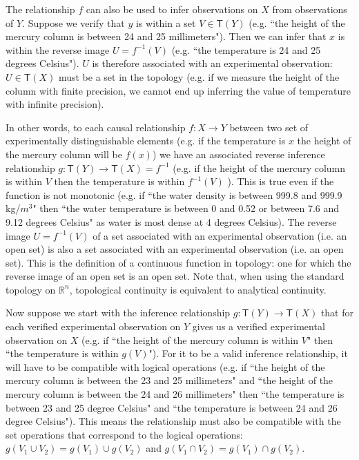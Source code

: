 \documentclass[11pt,letterpaper,fleqn]{memoir} %
\begin{document}
The relationship $f$ can also be used to infer observations on $X$ from observations of $Y$. Suppose we verify that $y$ is within a set $V \in \mathsf{T}(Y)$ (e.g. ``the height of the mercury column is between 24 and 25 millimeters"). Then we can infer that $x$ is within the reverse image $U=f^{-1}(V)$ (e.g. ``the temperature is 24 and 25 degrees Celsius"). $U$ is therefore associated with an experimental observation: $U \in \mathsf{T}(X)$ must be a set in the topology (e.g. if we measure the height of the column with finite precision, we cannot end up inferring the value of temperature with infinite precision).

In other words, to each causal relationship $f: X \rightarrow Y$ between two set of experimentally distinguishable elements (e.g. if the temperature is $x$ the height of the mercury column will be $f(x)$) we have an associated reverse inference relationship $g  : \mathsf{T}(Y) \rightarrow \mathsf{T}(X) = f^{-1}$ (e.g. if the height of the mercury column is within $V$ then the temperature is within $f^{-1}(V)$ ). This is true even if the function is not monotonic (e.g. if ``the water density is between 999.8 and 999.9 kg/$m^3$" then ``the water temperature is between 0 and 0.52 or between 7.6 and 9.12 degrees Celsius" as water is most dense at 4 degrees Celsius).  The reverse image $U=f^{-1}(V)$ of a set associated with an experimental observation (i.e. an open set) is also a set associated with an experimental observation (i.e. an open set). This is the definition of a continuous function in topology: one for which the reverse image of an open set is an open set. Note that, when using the standard topology on $\mathbb{R}^n$, topological continuity is equivalent to analytical continuity.

Now suppose we start with the inference relationship $g  : \mathsf{T}(Y) \rightarrow \mathsf{T}(X)$ that for each verified experimental observation on $Y$ gives us a verified experimental observation on $X$ (e.g. if ``the height of the mercury column is within $V$" then ``the temperature is within $g(V)$"). For it to be a valid inference relationship, it will have to be compatible with logical operations (e.g. if ``the height of the mercury column is between the 23 and 25 millimeters" and ``the height of the mercury column is between the 24 and 26 millimeters" then ``the temperature is between 23 and 25 degree Celsius" and  ``the temperature is between 24 and 26 degree Celsius"). This means the relationship must also be compatible with the set operations that correspond to the logical operations: $g(V_1 \cup V_2)=g(V_1)\cup g(V_2)$ and $g(V_1 \cap V_2)=g(V_1)\cap g(V_2)$.
\end{document}
